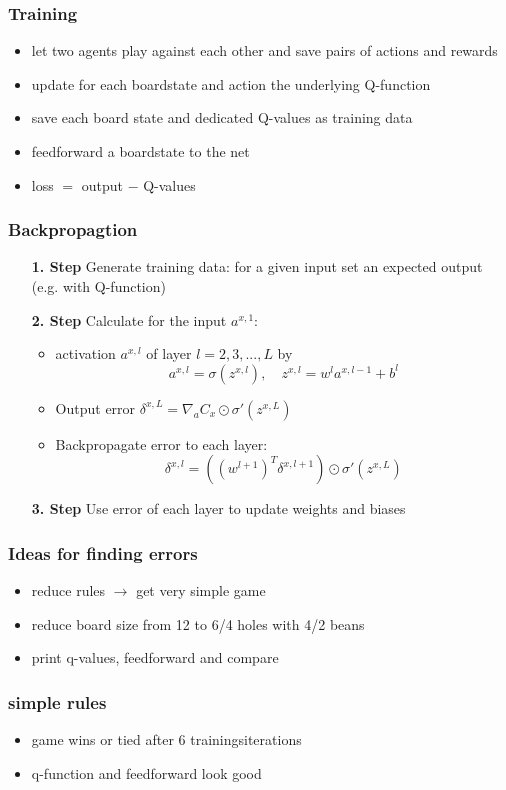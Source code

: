 \documentclass{beamer}
\begin{document}
 
 \begin{frame}
 \frametitle{Training}
 \begin{itemize}
\item let two agents play against each other and save pairs of actions and rewards
\item update for each boardstate and action the underlying Q-function
\item save each board state and dedicated Q-values as training data
\item feedforward a boardstate to the net
\item loss $=$ output $-$ Q-values
\end{itemize}
 \end{frame}
 
 \begin{frame}
 \frametitle{Backpropagtion}
 \begin{itemize}
 \item[\textbf{1. Step}] Generate training data: for a given input set an expected output (e.g. with Q-function)
 \item[\textbf{2. Step}] Calculate for the input $a^{x,1}$:
 \begin{itemize}
 \item activation $a^{x,l}$ of layer $l=2,3,...,L$ by
 $$a^{x,l} = \sigma(z^{x,l}),\quad z^{x,l} = w^l a^{x,l-1} + b^l$$
 \item Output error $\delta^{x,L} = \nabla_a C_x \odot \sigma'(z^{x,L})$
 \item Backpropagate error to each layer: 
 $$\delta^{x,l} = ((w^{l+1})^T \delta^{x,l+1}) \odot \sigma' (z^{x,L})$$
 \end{itemize}
 \item[\textbf{3. Step}] Use error of each layer to update weights and biases 
 \end{itemize}
 \end{frame}
 
\begin{frame}
\frametitle{Ideas for finding errors}
\begin{itemize}
\item reduce rules $\rightarrow$ get very simple game
\item reduce board size from 12 to 6/4 holes with 4/2 beans
\item print q-values, feedforward and compare
\end{itemize}
\end{frame}

\begin{frame}
\frametitle{simple rules}
\begin{itemize}
\item game wins or tied after $6$ trainingsiterations
\item q-function and feedforward look good
\end{itemize}
\end{frame}
\end{document}
